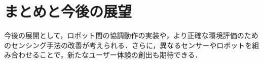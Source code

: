 \documentclass[paper=a4paper,jafontsize=9pt,head_space=15mm,gutter=20mm,
twocolumn,number_of_lines=49, line_length=26zw]{myuarticle}
\begin{document}
\section{まとめと今後の展望}%
今後の展開として，ロボット間の協調動作の実装や，より正確な環境評価のためのセンシング手法の改善が考えられる．さらに，異なるセンサーやロボットを組み合わせることで，新たなユーザー体験の創出も期待できる．



\renewcommand{\refname}{　参考文献}


\end{document}
